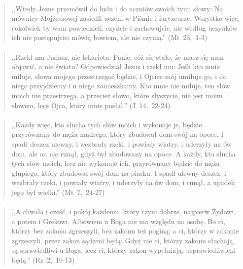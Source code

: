 \documentclass[10pt,a4paper,oneside]{article}
\begin{document}
\paragraph{}
\begin{quote}
,,Wtedy Jezus przemówił do ludu i do uczniów swoich tymi słowy: Na mównicy Mojżeszowej zasiedli uczeni w Piśmie i faryzeusze. Wszystko więc, cokolwiek by wam powiedzieli, czyńcie i zachowujcie, ale według uczynków ich nie postępujcie; mówią bowiem, ale nie czynią.'' \mbox{(Mt 23, 1-3)}
\end{quote}
\paragraph{}
\begin{quote}
,,Rzekł mu Judasz, nie Iskariota: Panie, cóż się stało, że masz się nam objawić, a nie światu? Odpowiedział Jezus i rzekł mu: Jeśli kto mnie miłuje, słowa mojego przestrzegać będzie, i Ojciec mój umiłuje go, i do niego przyjdziemy i u niego zamieszkamy. Kto mnie nie miłuje, ten słów moich nie przestrzega, a przecież słowo, które słyszycie, nie jest moim słowem, lecz Ojca, który mnie posłał.'' \mbox{(J 14, 22-24)}
\end{quote}
\paragraph{}
\begin{quote}
,,Każdy więc, kto słucha tych słów moich i wykonuje je, będzie przyrównany do męża mądrego, który zbudował dom swój na opoce. I spadł deszcz ulewny, i wezbrały rzeki, i powiały wiatry, i uderzyły na ów dom, ale on nie runął, gdyż był zbudowany na opoce. A każdy, kto słucha tych słów moich, lecz nie wykonuje ich, przyrównany będzie do męża głupiego, który zbudował swój dom na piasku. I spadł ulewny deszcz, i wezbrały rzeki, i powiały wiatry, i uderzyły na ów dom, i runął, a upadek jego był wielki.'' \mbox{(Mt 7, 24-27)}
\end{quote}
\paragraph{}
\begin{quote}
,,A chwała i cześć, i pokój każdemu, który czyni dobrze, najpierw Żydowi, a potem i Grekowi. Albowiem u Boga nie ma względu na osobę. Bo ci, którzy bez zakonu zgrzeszyli, bez zakonu też poginą; a ci, którzy w zakonie zgrzeszyli, przez zakon sądzeni będą; Gdyż nie ci, którzy zakonu słuchają, są sprawiedliwi u Boga, lecz ci, którzy zakon wypełniają, usprawiedliwieni będą.'' \mbox{(Rz 2, 10-13)}
\end{quote}
\end{document}
